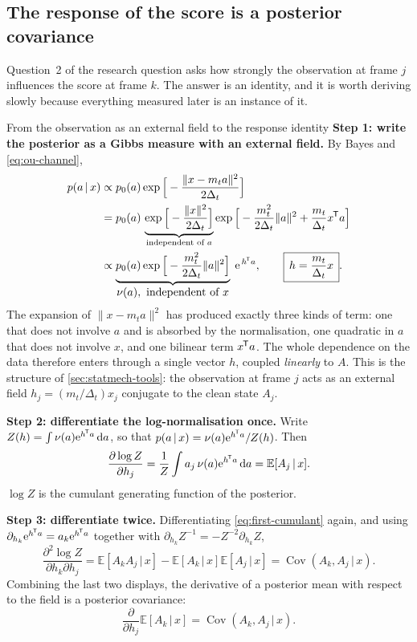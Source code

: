 \documentclass[11pt,a4paper]{article}
\newcommand{\E}{\mathbb{E}}
\newcommand{\given}{\,\vert\,}
\newcommand{\mt}{m_t}
\newcommand{\Dt}{\Delta_t}
\newcommand{\Cov}{\operatorname{Cov}}
\newcommand{\dd}{\,\mathrm d}
\newcommand{\e}{\mathrm e}
\newcommand{\T}{^{\mkern-1.5mu\mathsf{T}}}
\newcounter{toolbox}
\begin{document}
\subsection{The response of the score is a posterior covariance}\label{sec:response-identity}

Question~2 of the research question asks how strongly the observation at frame $j$ influences
the score at frame $k$. The answer is an identity, and it is worth deriving slowly because
everything measured later is an instance of it.

\begin{toolbox}{From the observation as an external field to the response identity}
\label{tb:response}
\textbf{Step 1: write the posterior as a Gibbs measure with an external field.} By Bayes and
\eqref{eq:ou-channel},
\begin{align}
 p(a\given x)
 &\propto p_0(a)\exp\Big[-\frac{\|x-\mt a\|^2}{2\Dt}\Big]
 \notag\\
 &=p_0(a)\,
   \underbrace{\exp\Big[-\frac{\|x\|^2}{2\Dt}\Big]}_{\text{independent of }a}
   \exp\Big[-\frac{\mt^2}{2\Dt}\|a\|^2+\frac{\mt}{\Dt}x\T a\Big]
 \notag\\
 &\propto \underbrace{p_0(a)\exp\Big[-\frac{\mt^2}{2\Dt}\|a\|^2\Big]}_{\textstyle
   \nu(a),\ \text{independent of }x}\;\e^{\,h\T a},
 \qquad
 \boxed{\,h=\frac{\mt}{\Dt}x\,}.
 \label{eq:posterior-gibbs}
\end{align}
The expansion of $\|x-\mt a\|^2$ has produced exactly three kinds of term: one that does not
involve $a$ and is absorbed by the normalisation, one quadratic in $a$ that does not involve
$x$, and one bilinear term $x\T a$. The whole dependence on the data therefore enters through
a single vector $h$, coupled \emph{linearly} to $A$. This is the structure of
\cref{sec:statmech-tools}: the observation at frame $j$ acts as an external field
$h_j=(\mt/\Dt)x_j$ conjugate to the clean state $A_j$.

\textbf{Step 2: differentiate the log-normalisation once.} Write
$Z(h)=\int\nu(a)\e^{h\T a}\dd a$, so that $p(a\given x)=\nu(a)\e^{h\T a}/Z(h)$. Then
\begin{equation}
 \frac{\partial\log Z}{\partial h_j}
 =\frac{1}{Z}\int a_j\,\nu(a)\e^{h\T a}\dd a
 =\E[A_j\given x] .
 \label{eq:first-cumulant}
\end{equation}
$\log Z$ is the cumulant generating function of the posterior.

\textbf{Step 3: differentiate twice.} Differentiating \eqref{eq:first-cumulant} again, and
using $\partial_{h_k}\e^{h\T a}=a_k\e^{h\T a}$ together with
$\partial_{h_k}Z^{-1}=-Z^{-2}\partial_{h_k}Z$,
\begin{equation}
 \frac{\partial^2\log Z}{\partial h_k\partial h_j}
 =\E[A_kA_j\given x]-\E[A_k\given x]\E[A_j\given x]
 =\Cov(A_k,A_j\given x) .
 \label{eq:second-cumulant}
\end{equation}
Combining the last two displays, the derivative of a posterior mean with respect to the field
is a posterior covariance:
\begin{equation}
 \frac{\partial}{\partial h_j}\E[A_k\given x]=\Cov(A_k,A_j\given x) .
 \label{eq:mean-response-h}
\end{equation}


\end{toolbox}
\end{document}
